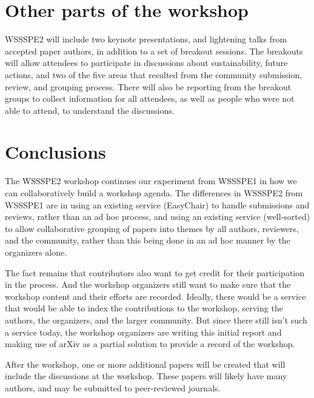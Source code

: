 \documentclass[11pt, oneside]{amsart}
\begin{document}
\section{Other parts of the workshop}

WSSSPE2 will include two keynote presentations, and lightening talks from accepted paper authors, in addition to a set of breakout sessions.  The breakouts will allow attendees to participate in discussions about sustainability, future actions, and two of the five areas that resulted from the community submission, review, and grouping process.  There will also be reporting from the breakout groups to collect information for all attendees, as well as people who were not able to attend, to understand the discussions.
 
\section{Conclusions}

The WSSSPE2 workshop continues our experiment from WSSSPE1 in how we can collaboratively build a workshop agenda.  The differences in WSSSPE2 from WSSSPE1 are in using an existing service (EasyChair) to handle submissions and reviews, rather than an ad hoc process, and using an existing service (well-sorted) to allow collaborative grouping of papers into themes by all authors, reviewers, and the community, rather than this being done in an ad hoc manner by the organizers alone.

The fact remains that contributors also want to get credit for their participation in the process.  And the workshop organizers still want to make sure that the workshop content and their efforts are recorded.  Ideally, there would be a service that would be able to index the contributions to the workshop, serving the authors, the organizers, and the larger community.  But since there still isn't such a service today, the workshop organizers are writing this initial report and making use of arXiv as a partial solution to provide a record of the workshop.

After the workshop, one or more additional papers will be created that will include the discussions at the workshop.  These papers will likely have many authors, and may be submitted to peer-reviewed journals.




\end{document}
